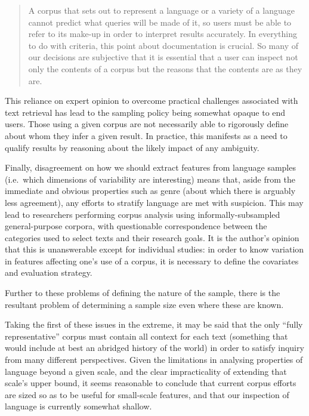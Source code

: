 \begin{quote}
A corpus that sets out to represent a language or a variety of a language cannot predict what queries will be made of it, so users must be able to refer to its make-up in order to interpret results accurately. In everything to do with criteria, this point about documentation is crucial. So many of our decisions are subjective that it is essential that a user can inspect not only the contents of a corpus but the reasons that the contents are as they are.
\end{quote}


This reliance on expert opinion to overcome practical challenges associated with text retrieval has lead to the sampling policy being somewhat opaque to end users.
Those using a given corpus are not necessarily able to rigorously define about whom they infer a given result.  In practice, this manifests as a need to qualify results by reasoning about the likely impact of any ambiguity.



Finally, disagreement on how we should extract features from language samples (i.e.\ which dimensions of variability are interesting) means that, aside from the immediate and obvious properties such as genre (about which there is arguably less agreement\cite{lee2001genres,aston2001text,sharoffs2015}), any efforts to stratify language are met with suspicion.  This may lead to researchers performing corpus analysis using informally-subsampled general-purpose corpora, with questionable correspondence between the categories used to select texts and their research goals.
It is the author's opinion that this is unanswerable except for individual studies: in order to know variation in features affecting one's use of a corpus, it is necessary to define the covariates and evaluation strategy.



Further to these problems of defining the nature of the sample, there is the resultant problem of determining a sample size even where these are known.  

Taking the first of these issues in the extreme, it may be said that the only ``fully representative'' corpus must contain all context for each text (something that would include at best an abridged history of the world) in order to satisfy inquiry from many different perspectives.  Given the limitations in analysing properties of language beyond a given scale, and the clear impracticality of extending that scale's upper bound, it seems reasonable to conclude that current corpus efforts are sized so as to be useful for small-scale features, and that our inspection of language is currently somewhat shallow.

